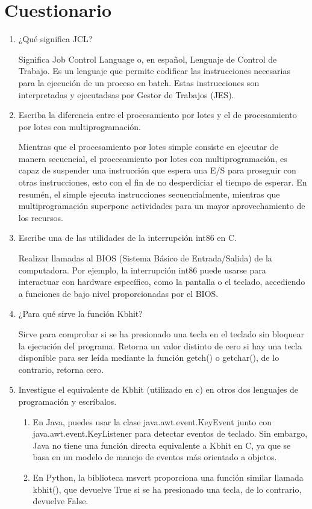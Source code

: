 \documentclass[12pt, a4paper]{article} %
\begin{document}
\clearpage
\section{Cuestionario}

\begin{enumerate}
	\item ¿Qué significa JCL?

		Significa Job Control Language o, en español, Lenguaje de Control de Trabajo. Es un lenguaje que permite codificar las instrucciones necesarias para la ejecución de un proceso en batch. Estas instrucciones son interpretadas y ejecutadsas por Gestor de Trabajos (JES).
		
	\item Escriba la diferencia entre el procesamiento por lotes y el de procesamiento por lotes con multiprogramación.

		Mientras que el procesamiento por lotes simple consiste en ejecutar de manera secuencial, el procecamiento por lotes con multiprogramación, es capaz de suspender una instrucción que espera una E/S para proseguir con otras instrucciones, esto con el fin de no desperdiciar el tiempo de esperar. En resumén, el simple ejecuta instrucciones secuencialmente, mientras que multiprogramación superpone actividades para un mayor aprovechamiento de los recursos.

	\item Escribe una de las utilidades de la interrupción int86 en C.

		Realizar llamadas al BIOS (Sistema Básico de Entrada/Salida) de la computadora. Por ejemplo, la interrupción int86 puede usarse para interactuar con hardware específico, como la pantalla o el teclado, accediendo a funciones de bajo nivel proporcionadas por el BIOS.

	\item ¿Para qué sirve la función Kbhit?

		Sirve para comprobar si se ha presionado una tecla en el teclado sin bloquear la ejecución del programa. Retorna un valor distinto de cero si hay una tecla disponible para ser leída mediante la función getch() o getchar(), de lo contrario, retorna cero.

	\item Investigue el equivalente de Kbhit (utilizado en c) en otros dos lenguajes de programación y escríbalos.

		\begin{enumerate}
			\item En Java, puedes usar la clase java.awt.event.KeyEvent junto con java.awt.event.KeyListener para detectar eventos de teclado. Sin embargo, Java no tiene una función directa equivalente a Kbhit en C, ya que se basa en un modelo de manejo de eventos más orientado a objetos.

			\item En Python, la biblioteca msvcrt proporciona una función similar llamada kbhit(), que devuelve True si se ha presionado una tecla, de lo contrario, devuelve False.
		\end{enumerate}
\end{enumerate}


\nocite{*} %

\clearpage


\end{document}
